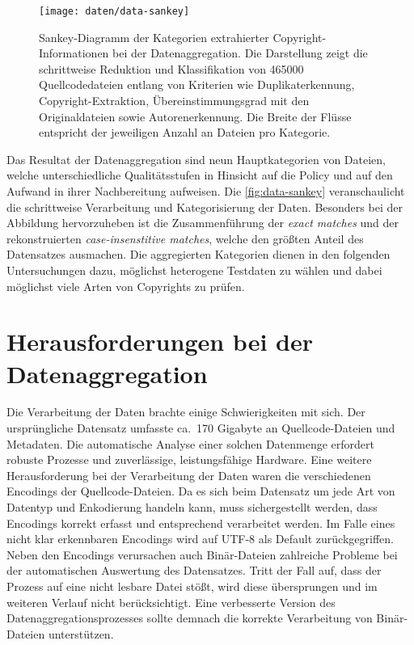 \begin{figure}[ht]
    \centering
    \texttt{[image: daten/data-sankey]}
    \caption{
Sankey-Diagramm der Kategorien extrahierter Copyright-Informationen bei der Datenaggregation. Die Darstellung zeigt die schrittweise Reduktion und Klassifikation von \num{465000} Quellcodedateien entlang von Kriterien wie Duplikaterkennung, Copyright-Extraktion, Übereinstimmungsgrad mit den Originaldateien sowie Autorenerkennung. Die Breite der Flüsse entspricht der jeweiligen Anzahl an Dateien pro Kategorie.}
    \label{fig:data-sankey}
\end{figure}
Das Resultat der Datenaggregation sind neun Hauptkategorien von Dateien, welche unterschiedliche Qualitätsstufen in Hinsicht auf die Policy und auf den Aufwand in ihrer Nachbereitung aufweisen.
Die \autoref{fig:data-sankey} veranschaulicht die schrittweise Verarbeitung und Kategorisierung der Daten.
Besonders bei der Abbildung hervorzuheben ist die Zusammenführung der \textit{exact matches} und der rekonstruierten \textit{case-insenstitive matches}, welche den größten Anteil des Datensatzes ausmachen.
Die aggregierten Kategorien dienen in den folgenden Untersuchungen dazu, möglichst heterogene Testdaten zu wählen und dabei möglichst viele Arten von Copyrights zu prüfen.


\section{Herausforderungen bei der Datenaggregation}\label{sec:herausforderungen-datenaggregation}

Die Verarbeitung der Daten brachte einige Schwierigkeiten mit sich.
Der ursprüngliche Datensatz umfasste ca.\ 170 Gigabyte an Quellcode-Dateien und Metadaten.
Die automatische Analyse einer solchen Datenmenge erfordert robuste Prozesse und zuverlässige, leistungsfähige Hardware.
Eine weitere Herausforderung bei der Verarbeitung der Daten waren die verschiedenen Encodings der Quellcode-Dateien.
Da es sich beim Datensatz um jede Art von Datentyp und Enkodierung handeln kann, muss sichergestellt werden, dass Encodings korrekt erfasst und entsprechend verarbeitet werden.
Im Falle eines nicht klar erkennbaren Encodings wird auf UTF-8 als Default zurückgegriffen.
Neben den Encodings verursachen auch Binär-Dateien zahlreiche Probleme bei der automatischen Auswertung des Datensatzes.
Tritt der Fall auf, dass der Prozess auf eine nicht lesbare Datei stößt, wird diese übersprungen und im weiteren Verlauf nicht berücksichtigt.
Eine verbesserte Version des Datenaggregationsprozesses sollte demnach die korrekte Verarbeitung von Binär-Dateien unterstützen.

